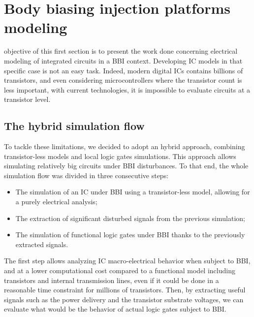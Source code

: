 
\section{Body biasing injection platforms modeling}
 objective of this first section is to present the work done concerning electrical modeling of integrated circuits in a BBI context.
Developing IC models in that specific case is not an easy task.
Indeed, modern digital ICs contains billions of transistors, and even considering microcontrollers where the transistor count is less important, with current technologies, it is impossible to evaluate circuits at a transistor level.

\subsection{The hybrid simulation flow}
To tackle these limitations, we decided to adopt an hybrid approach, combining transistor-less models and local logic gates simulations.
This approach allows simulating relatively big circuits under BBI disturbances.
To that end, the whole simulation flow was divided in three consecutive steps:
\begin{itemize}
	\item The simulation of an IC under BBI using a transistor-less model, allowing for a purely electrical analysis;
	\item The extraction of significant disturbed signals from the previous simulation;
	\item The simulation of functional logic gates under BBI thanks to the previously extracted signals.
\end{itemize}
The first step allows analyzing IC macro-electrical behavior when subject to BBI, and at a lower computational cost compared to a functional model including transistors and internal transmission lines, even if it could be done in a reasonable time constraint for millions of transistors.
Then, by extracting useful signals such as the power delivery and the transistor substrate voltages, we can evaluate what would be the behavior of actual logic gates subject to BBI.

